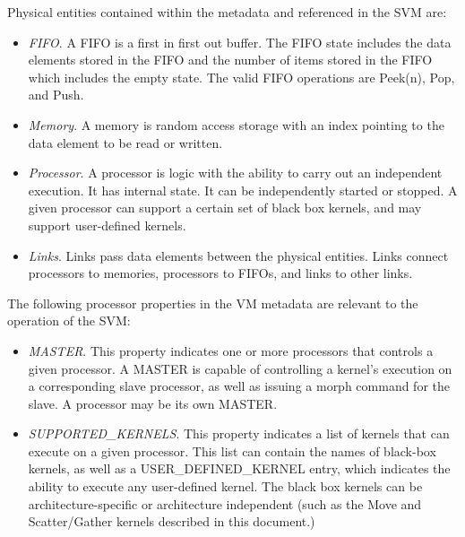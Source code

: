 
Physical entities contained within the metadata and referenced in the
SVM are:

\begin{itemize}

\item {\it FIFO}.  A FIFO is a first in first out buffer.  The FIFO
state includes the data elements stored in the FIFO and the number of
items stored in the FIFO which includes the empty state.  The valid
FIFO operations are Peek(n), Pop, and Push.

\item {\it Memory}. A memory is random access storage with an index
pointing to the data element to be read or written.

\item {\it Processor}. A processor is logic with the ability to carry
out an independent execution.  It has internal state.  It can be
independently started or stopped.  A given processor can support a
certain set of black box kernels, and may support user-defined
kernels.

\item {\it Links}. Links pass data elements between the physical
entities.  Links connect processors to memories, processors to FIFOs,
and links to other links.

\end{itemize}


The following processor properties in the VM metadata are relevant to
the operation of the SVM:

\begin{itemize}

\item {\it MASTER}.  This property indicates one or more processors
that controls a given processor.  A MASTER is capable of controlling a
kernel's execution on a corresponding slave processor, as well as
issuing a morph command for the slave.  A processor may be its own
MASTER.

\item {\it SUPPORTED\_KERNELS}.  This property indicates a list of
kernels that can execute on a given processor.  This list can contain
the names of black-box kernels, as well as a USER\_DEFINED\_KERNEL
entry, which indicates the ability to execute any user-defined kernel.
The black box kernels can be architecture-specific or architecture
independent (such as the Move and Scatter/Gather kernels described in
this document.)

\end{itemize}

